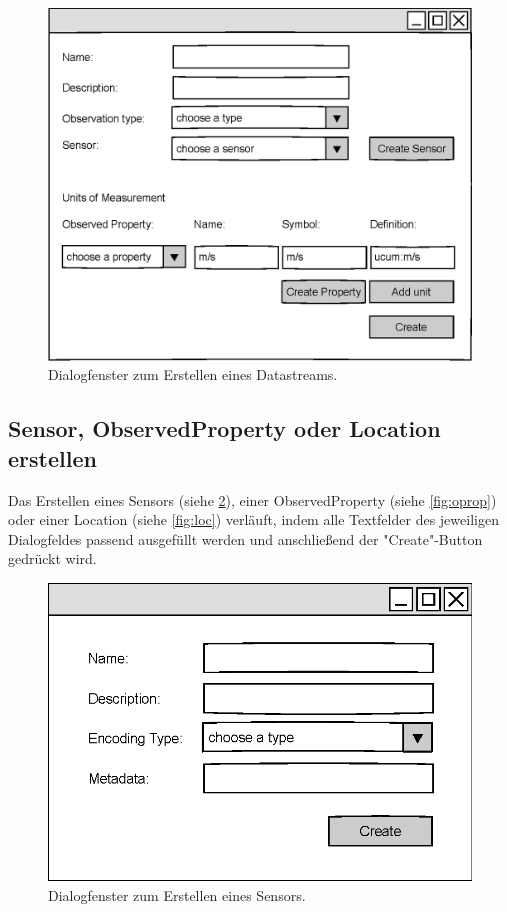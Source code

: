 \documentclass[12 pt]{article}
\begin{document}
\begin{figure}[htbp]
\centering
\includegraphics[scale=1]{images/datastream}
\caption{\label{fig:ds}Dialogfenster zum Erstellen eines Datastreams.}
\end{figure}

\subsection{Sensor, ObservedProperty oder Location erstellen}
Das Erstellen eines Sensors (siehe \cref{fig:sensor}), einer ObservedProperty (siehe \cref{fig:oprop}) oder einer Location (siehe \cref{fig:loc}) verläuft, indem alle Textfelder des jeweiligen Dialogfeldes passend ausgefüllt werden und anschließend der "{Create}"{-Button} gedrückt wird.

\begin{figure}[htbp]
\centering
\includegraphics[scale=1]{images/sensor}
\caption{\label{fig:sensor}Dialogfenster zum Erstellen eines Sensors.}
\end{figure}
\end{document}
